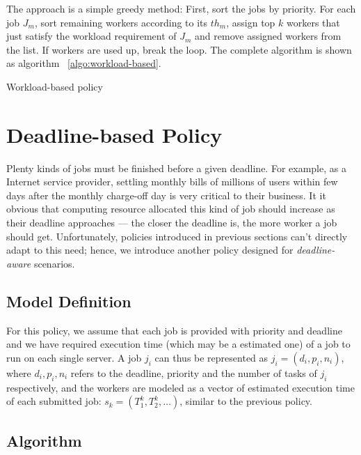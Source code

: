 The approach is a simple greedy method:
First, sort the jobs by priority.
For each job $J_m$, sort remaining workers according to its $th_m$,
assign top $k$ workers that just satisfy the workload requirement of
$J_m$ and remove assigned workers from the list.
If workers are used up, break the loop.
The complete algorithm is shown as algorithm ~\ref{algo:workload-based}.

\begin{algorithm}[H]
  \DontPrintSemicolon %
  
  \caption{Workload-based policy}
  \label{algo:workload-based}
\end{algorithm}

\section{Deadline-based Policy}

Plenty kinds of jobs must be finished before a given deadline.
For example, as a Internet service provider, settling monthly bills of
millions of users within few days after the monthly charge-off day is
very critical to their business.
It it obvious that computing resource allocated this kind of job should
increase as their deadline approaches --- the closer the deadline is, the
more worker a job should get.
Unfortunately, policies introduced in previous sections can't directly
adapt to this need; hence, we introduce another policy designed for
\emph{deadline-aware} scenarios.

\subsection{Model Definition}

For this policy, we assume that each job is provided with priority and
deadline and we have required execution time (which may be a estimated
one) of a job to run on each single server.
A job $j_i$ can thus be represented as $j_i = (d_i, p_i, n_i)$, where
$d_i, p_i, n_i$ refers to the deadline, priority and the number of tasks
of $j_i$ respectively, and the workers are modeled as a vector of
estimated execution time of each submitted job: $s_k = (T^k_1, T^k_2,
\ldots)$, similar to the previous policy.

\subsection{Algorithm}

